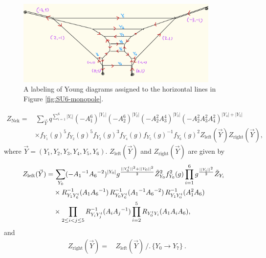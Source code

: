 \documentclass[11pt,a4paper]{article}
\newcommand{\nn}{\nonumber}
\begin{document}
\begin{figure}[t]
\centering
\includegraphics[width=10cm]{SU6young.jpeg}
\caption{A labeling of Young diagrams assigned to the horizontal lines in Figure \ref{fig:SU6-monopole}.}
\label{fig:SU6young}
\end{figure}

\begin{align}
Z_{\text{Nek}} 
=&\, \sum_{\vec{Y}}q^{\sum_{i=1}^6|Y_i|} (-A_1^6)^{|Y_1|}(-A_2^6)^{|Y_2|}
(-A_2^2A_3^4)^{|Y_3|} (-A_2^2A_3^2A_4^2)^{|Y_4| + |Y_5|}
\nn\\
&\times f_{Y_1}(g)^5f_{Y_2}(g)^5f_{Y_3}(g)^3f_{Y_4}(g)f_{Y_5}(g)^{-1}f_{Y_6}(g)^{2}Z_{\text{left}}(\vec{Y})Z_{\text{right}}(\vec{Y}), \label{Znek1}
\end{align}
where $\vec{Y}=(Y_1, Y_2, Y_3, Y_4, Y_5, Y_6)$.
$Z_{\text{left}}(\vec{Y})$ and $Z_{\text{right}}(\vec{Y})$ are given by
\begin{align}
Z_{\text{left}}(\vec{Y})=& \,
\sum_{Y_0} ( - A_1{}^{-1} A_6{}^{-2})^{|Y_0|} 
g^{\frac{||Y_0^t||^2+||Y_0||^2}{2}} \tilde{Z}_{Y_0}^2 f_{Y_0}^2(g)
\prod_{i=1}^6 g^{\frac{||Y_i||^2}{2}} \tilde{Z}_{Y_i} 
\cr 
& 
\times 
R_{Y_1 Y_6^t}^{-1} (A_1 A_6{}^{-1})\,R_{Y_0 Y_6^t}^{-1} (A_1{}^{-1} A_6{}^{-2})\,R_{Y_1Y_0^t }^{-1} (A_1^2A_6) \cr 
& 
\times  
 \prod_{2 \le i <  j \le 5} R_{Y_i Y_j^t}^{-1} (A_i A_j{}^{-1})
 \prod_{i=2}^5 R_{Y_0^t Y_i} (A_1 A_i  A_6) ,
\end{align}
and
\begin{align}
Z_{\text{right}}(\vec{Y})=&\, Z_{\text{left}}(\vec{Y})\,/.\,\{Y_0 \to Y_7 \}~.
\end{align}
\end{document}
